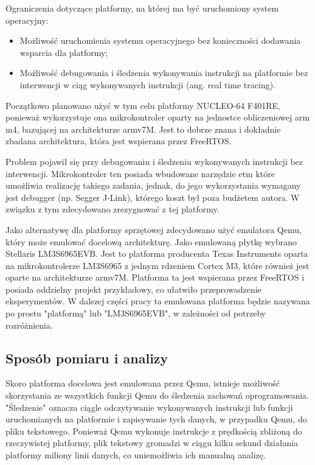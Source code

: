 \documentclass[../../main]{subfiles}
\begin{document}
Ograniczenia dotyczące platformy, na której ma być uruchomiony system operacyjny:

\begin{itemize}
    \item Możliwość uruchomienia systemu operacyjnego bez konieczności dodawania wsparcia dla platformy;
    \item Możliwość debugowania i śledzenia wykonywania instrukcji na platformie bez interwencji w ciąg wykonywanych instrukcji (ang. real time tracing).
\end{itemize}

Początkowo planowano użyć w tym celu platformy NUCLEO-64 F401RE, ponieważ wykorzystuje ona mikrokontroler oparty na jednostce obliczeniowej \gls{arm} \gls{m}4, bazującej na architekturze \gls{arm}v7M. Jest to dobrze znana i dokładnie zbadana architektura, która jest wspierana przez FreeRTOS.

Problem pojawił się przy debugowaniu i śledzeniu wykonywanych instrukcji bez interwencji. Mikrokontroler ten posiada wbudowane narzędzie \gls{etm} które umożliwia realizację takiego zadania, jednak, do jego wykorzystania wymagany jest debugger (np. Segger J-Link), którego koszt był poza budżetem autora. W związku z tym zdecydowano zrezygnować z tej platformy.

Jako alternatywę dla platformy sprzętowej zdecydowano użyć emulatora Qemu, który może emulować docelową architekturę. Jako emulowaną płytkę wybrano Stellaris LM3S6965EVB. Jest to platforma producenta Texas Instruments oparta na mikrokontrolerze LM3S6965 z jednym rdzeniem Cortex M3, które również jest oparte na architekturze \gls{arm}v7M. Platforma ta jest wspierana przez FreeRTOS i posiada oddzielny projekt przykładowy, co ułatwiło przeprowadzenie eksperymentów. W dalszej części pracy ta emulowana platforma będzie nazywana po prostu "platformą" lub "LM3S6965EVB", w zależności od potrzeby rozróżnienia.

\subsection{Sposób pomiaru i analizy}

Skoro platforma docelowa jest emulowana przez Qemu, istnieje możliwość skorzystania ze wszystkich funkcji Qemu do śledzenia zachowań oprogramowania. "Śledzenie" oznacza ciągle odczytywanie wykonywanych instrukcji lub funkcji uruchomianych na platformie i zapisywanie tych danych, w przypadku Qemu, do pliku tekstowego. Ponieważ Qemu wykonuje instrukcje z prędkością zbliżoną do rzeczywistej platformy, plik tekstowy gromadzi w ciągu kilku sekund działania platformy miliony linii danych, co uniemożliwia ich manualną analizę.
\end{document}

